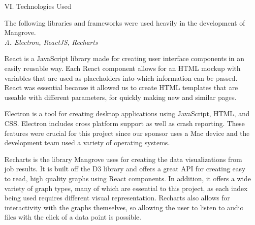\begin{center}
VI. Technologies Used
\end{center}
\begin{flushleft}
  \setlength{\parindent}{0.125in}
The following libraries and frameworks were used heavily in the development of Mangrove.\\

\noindent\textit{A. Electron, ReactJS, Recharts}\par
React is a JavaScript library made for creating user interface components in an easily reusable way. Each React component allows for an HTML mockup with variables that are used as placeholders into which information can be passed. React was essential because it allowed us to create HTML templates that are useable with different parameters, for quickly making new and similar pages.\par
Electron is a tool for creating desktop applications using JavaScript, HTML, and CSS. Electron includes cross platform support as well as crash reporting. These features were crucial for this project since our sponsor uses a Mac device and the development team used a variety of operating systems.\par
Recharts is the library Mangrove uses for creating the data visualizations from job results. It is built off the D3 library and offers a great API for creating easy to read, high quality graphs using React components. In addition, it offers a wide variety of graph types, many of which are essential to this project, as each index being used requires different visual representation. Recharts also allows for interactivity with the graphs themselves, so allowing the user to listen to audio files with the click of a data point is possible.\par


\end{flushleft}
